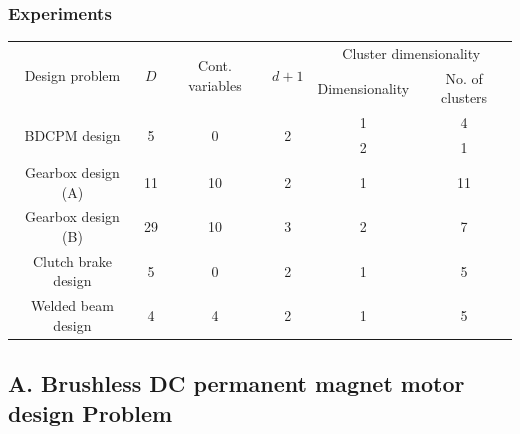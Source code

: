 \documentclass[svgnames, table, smaller]{beamer}
\begin{document}
\begin{frame}
  \frametitle{Experiments}

{\tiny
\begin{table}[!ht]
  \centering
  \begin{tabular}{|c|c|c|c|c|c|}
    \hline
    \multirow{2}{*}{Design problem} & \multirow{2}{*}{$D$} & \multirow{2}{*}{Cont. variables} & \multirow{2}{*}{$d+1$}  & \multicolumn{2}{c|}{Cluster dimensionality} \\
    \cline{5-6} 
    &&&&Dimensionality & No. of clusters \\
    \hline
    \multirow{2}{*}{BDCPM design} & \multirow{2}{*}{5} & \multirow{2}{*}{0} & \multirow{2}{*}{2} & 1 & 4 \\
    \cline{5-6} 
    &&&&2 & 1 \\
    \hline
    Gearbox design (A) & 11 &10 & 2 & 1 & 11 \\
    \hline
    Gearbox design (B) & 29 & 10 & 3 & 2 & 7 \\
    \hline
    Clutch brake design & 5 & 0 & 2 & 1 & 5 \\
    \hline
    Welded beam design & 4 & 4 & 2 & 1 & 5 \\

    \hline
  \end{tabular}
  \label{expSummary}
\end{table}
}

  

\end{frame}

\subsection{A. Brushless DC permanent magnet motor design Problem}
\end{document}

